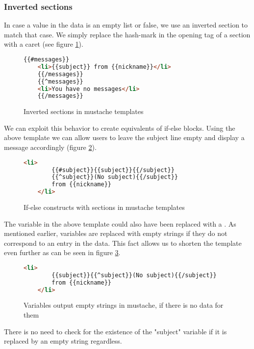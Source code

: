 \subsubsection{Inverted sections}
In case a value in the data is an empty list or false, we use an inverted
section to match that case. We simply replace the hash-mark in the opening tag
of a section with a caret (see figure \ref{fig:inverted-example.mustache}).
\begin{figure}
	\label{fig:inverted-example.mustache}
	\centering
	\caption{Inverted sections in mustache templates}
	\begin{lstlisting}[language=HTML]
	{{#messages}}
	<li>{{subject}} from {{nickname}}</li>
	{{/messages}}
	{{^messages}}
	<li>You have no messages</li>
	{{/messages}}
	\end{lstlisting}
\end{figure}

We can exploit this behavior to create equivalents of if-else blocks.
Using the above template we can allow users to leave the subject line empty
and display a message accordingly (figure \ref{fig:ifelse-example.mustache}).
\begin{figure}
	\label{fig:ifelse-example.mustache}
	\centering
	\caption{If-else constructs with sections in mustache templates}
	\begin{lstlisting}[language=HTML]
	<li>
		{{#subject}}{{subject}}{{/subject}}
		{{^subject}}(No subject){{/subject}}
		from {{nickname}}
	</li>
	\end{lstlisting}
\end{figure}

The  variable in the above template could also have been
replaced with a . As mentioned earlier, variables are replaced
with empty strings if they do not correspond to an entry in the data.
This fact allows us to shorten the template even further as can be seen in
figure \ref{fig:emptystr-example.mustache}.
\begin{figure}
	\label{fig:emptystr-example.mustache}
	\centering
	\caption{Variables output empty strings in mustache, if there is no data for them}
	\begin{lstlisting}[language=HTML]
	<li>
		{{subject}}{{^subject}}(No subject){{/subject}}
		from {{nickname}}
	</li>
	\end{lstlisting}
\end{figure}

There is no need to check for the existence of the "subject" variable if it is
replaced by an empty string regardless.

